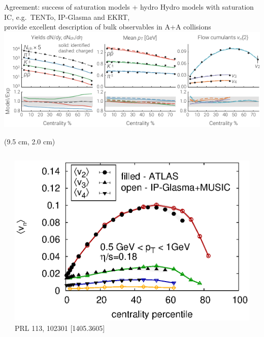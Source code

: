 \documentclass{beamer}
\newcommand{\trento}{T\raisebox{-0.3ex}{R}ENTo}
\begin{document}
\begin{frame}[plain]{Agreement: success of saturation models + hydro}
  \centering
  \medskip
  \scriptsize Hydro models with saturation IC, e.g.\ \trento, IP-Glasma and EKRT,\\
  provide excellent description of bulk observables in A+A collisions \\[1ex]
  \includegraphics[width=.8\textwidth]{mode_observables} \\[1ex]
  \begin{textblock*}{0.3\textwidth}(9.5 cm, 2.0 cm)
  \end{textblock*}
  \begin{columns}
    \begin{column}{.075\textwidth}
    \end{column}
    \begin{column}{.45\textwidth}
      \centering
      \includegraphics[width=\columnwidth]{vn_ipglasma.eps} \\
      {\tiny PRL 113, 102301 [1405.3605]}
    \end{column}
    \begin{column}{.4\textwidth}
      \centering

\end{column}
\end{columns}
\end{frame}
\end{document}
